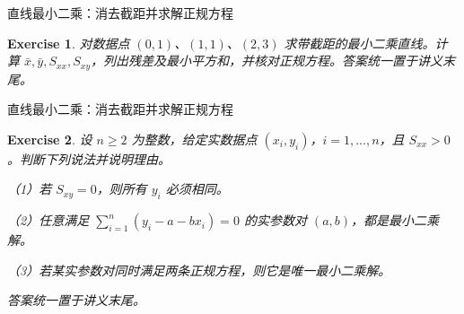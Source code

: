 \documentclass[aspectratio=169,10pt,fontset=fandol]{ctexbeamer}
\newtheorem{exercise}{Exercise}
\begin{document}
\begin{frame}[t,fragile]{直线最小二乘：消去截距并求解正规方程}
\normalsize
{\normalsize
\begin{exercise}
\label{mathagent:exercise:332ae2e99c79cf97370ba4732967ff23f2a2c4a4b36b98eda8e910755bf43b8b}
对数据点 $(0,1)$、$(1,1)$、$(2,3)$ 求带截距的最小二乘直线。计算 $\bar{x},\bar{y},S_{xx},S_{xy}$，列出残差及最小平方和，并核对正规方程。答案统一置于讲义末尾。
\end{exercise}
}
\end{frame}
\begin{frame}[t,fragile]{直线最小二乘：消去截距并求解正规方程}
\normalsize
{\normalsize
\begin{exercise}
\label{mathagent:exercise:b4c9c9a1fb82bcef052fdbf6e1539831ed88cee016dbcbf83a50e5e8d2311be0}
设 $n\geq2$ 为整数，给定实数据点 $(x_i,y_i)$，$i=1,\ldots,n$，且 $S_{xx}>0$。判断下列说法并说明理由。

（1）若 $S_{xy}=0$，则所有 $y_i$ 必须相同。

（2）任意满足 $\sum_{i=1}^{n}(y_i-a-bx_i)=0$ 的实参数对 $(a,b)$，都是最小二乘解。

（3）若某实参数对同时满足两条正规方程，则它是唯一最小二乘解。

答案统一置于讲义末尾。
\end{exercise}
}
\end{frame}
\end{document}
